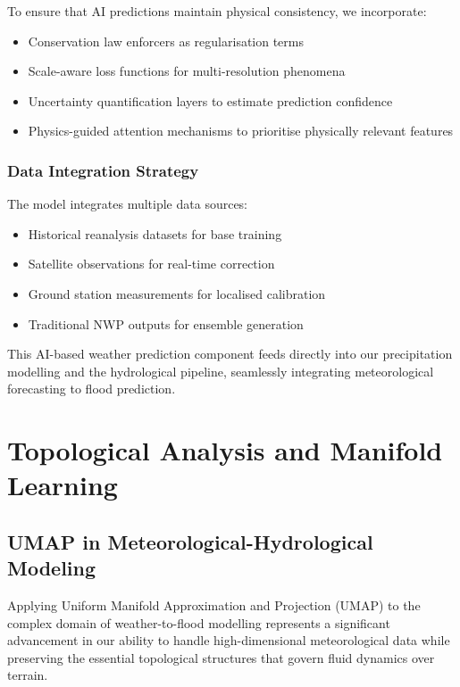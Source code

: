 \documentclass{article}
\begin{document}
To ensure that AI predictions maintain physical consistency, we incorporate:

\begin{itemize}
    \item Conservation law enforcers as regularisation terms
    \item Scale-aware loss functions for multi-resolution phenomena
    \item Uncertainty quantification layers to estimate prediction confidence
    \item Physics-guided attention mechanisms to prioritise physically relevant features
\end{itemize}

\subsubsection{Data Integration Strategy}

The model integrates multiple data sources:

\begin{itemize}
    \item Historical reanalysis datasets for base training
    \item Satellite observations for real-time correction
    \item Ground station measurements for localised calibration
    \item Traditional NWP outputs for ensemble generation
\end{itemize}

This AI-based weather prediction component feeds directly into our precipitation modelling and the hydrological pipeline, seamlessly integrating meteorological forecasting to flood prediction.

\section{Topological Analysis and Manifold Learning}

\subsection{UMAP in Meteorological-Hydrological Modeling}

Applying Uniform Manifold Approximation and Projection (UMAP) to the complex domain of weather-to-flood modelling represents a significant advancement in our ability to handle high-dimensional meteorological data while preserving the essential topological structures that govern fluid dynamics over terrain.
\end{document}
